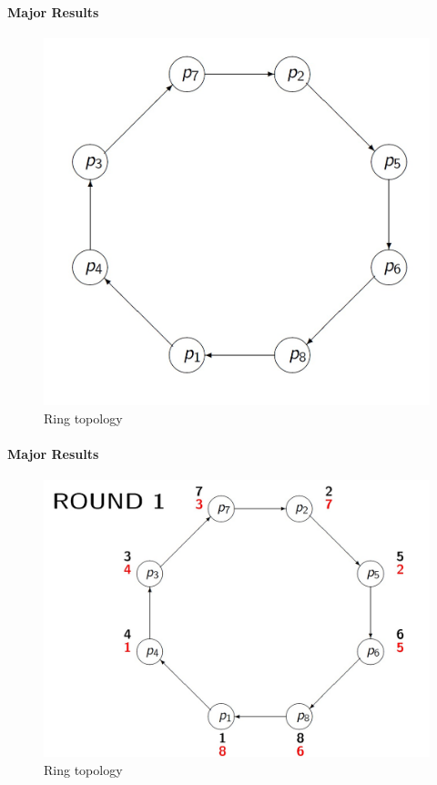 \documentclass[11pt]{beamer}              %
\begin{document}
\begin{frame}{}
\framesubtitle{Major Results}

\begin{figure}
    \centering
    \includegraphics[scale=0.3]{figures/Screen7.jpg}
    \caption{Ring topology}
    \label{fig:Ring topology}
\end{figure}
\note{
}
\end{frame}


\begin{frame}{}
\framesubtitle{Major Results}

\begin{figure}
    \centering
    \includegraphics[scale=0.3]{figures/Screen9.jpg}
    \caption{Ring topology}
    \label{fig:Ring topology}
\end{figure}
\note{
}
\end{frame}
\end{document}
